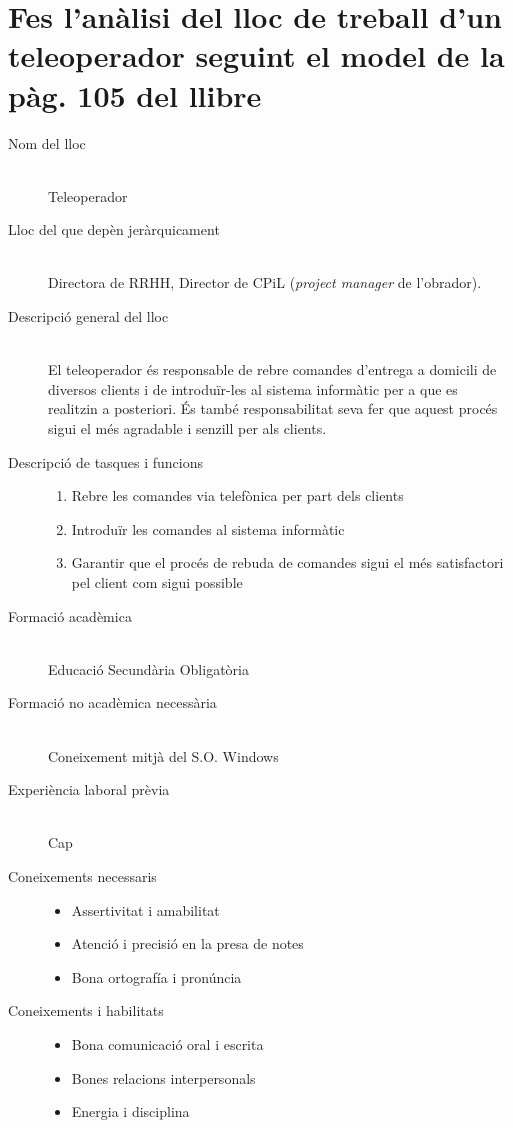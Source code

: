 \section{Fes l’anàlisi del lloc de treball d’un teleoperador seguint el model de la pàg. 105 del llibre}

\begin{description}
  \item[Nom del lloc]
  \hfill \\
  Teleoperador
  \item[Lloc del que depèn jeràrquicament]
  \hfill \\
  Directora de RRHH, Director de CPiL (\textit{project manager} de l'obrador).
  \item[Descripció general del lloc]
  \hfill \\
  El teleoperador és responsable de rebre comandes d'entrega a domicili de diversos clients i de introduïr-les al sistema informàtic per a que es realitzin a posteriori. És també responsabilitat seva fer que aquest procés sigui el més agradable i senzill per als clients.
  \item[Descripció de tasques i funcions]
  \hfill
  \begin{enumerate}
    \item Rebre les comandes via telefònica per part dels clients
    \item Introduïr les comandes al sistema informàtic
    \item Garantir que el procés de rebuda de comandes sigui el més satisfactori pel client com sigui possible
  \end{enumerate}
  \item[Formació acadèmica]
  \hfill \\
  Educació Secundària Obligatòria
  \item[Formació no acadèmica necessària]
  \hfill \\
  Coneixement mitjà del S.O. Windows
  \item[Experiència laboral prèvia]
  \hfill \\
  Cap
  \item[Coneixements necessaris]
  \hfill
  \begin{itemize}
    \item Assertivitat i amabilitat
    \item Atenció i precisió en la presa de notes
    \item Bona ortografía i pronúncia
  \end{itemize}
  \item[Coneixements i habilitats]
  \hfill
  \begin{itemize}
    \item Bona comunicació oral i escrita
    \item Bones relacions interpersonals
    \item Energia i disciplina
  \end{itemize}
\end{description}
